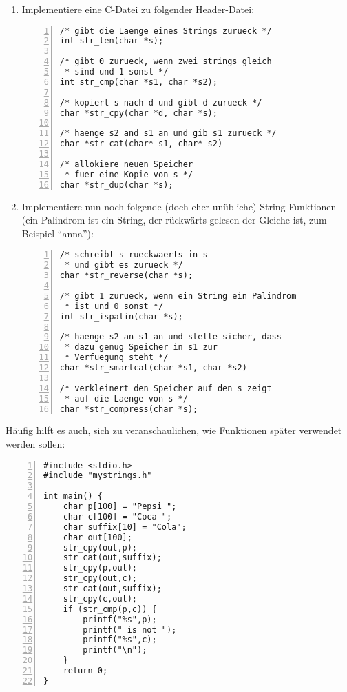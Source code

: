 \documentclass{uebungszettel}
\begin{document}
\begin{aufg}
\begin{enumerate}
\item Implementiere eine C-Datei zu folgender Header-Datei:
\begin{codelisting}
\begin{lstlisting}[numbers=left,numberstyle=\tiny,frame=tlrb]
/* gibt die Laenge eines Strings zurueck */
int str_len(char *s); 

/* gibt 0 zurueck, wenn zwei strings gleich 
 * sind und 1 sonst */
int str_cmp(char *s1, char *s2);

/* kopiert s nach d und gibt d zurueck */
char *str_cpy(char *d, char *s);

/* haenge s2 and s1 an und gib s1 zurueck */ 
char *str_cat(char* s1, char* s2)

/* allokiere neuen Speicher
 * fuer eine Kopie von s */
char *str_dup(char *s);
\end{lstlisting}
\end{codelisting}
\item \vspace{-1em} Implementiere nun noch folgende (doch eher unübliche) String-Funktionen (ein Palindrom ist ein String, der rückwärts gelesen der Gleiche ist, zum
Beispiel ``anna''):
\begin{codelisting}
\begin{lstlisting}[numbers=left,numberstyle=\tiny,frame=tlrb]
/* schreibt s rueckwaerts in s
 * und gibt es zurueck */
char *str_reverse(char *s);

/* gibt 1 zurueck, wenn ein String ein Palindrom
 * ist und 0 sonst */
int str_ispalin(char *s);

/* haenge s2 an s1 an und stelle sicher, dass
 * dazu genug Speicher in s1 zur
 * Verfuegung steht */
char *str_smartcat(char *s1, char *s2)

/* verkleinert den Speicher auf den s zeigt
 * auf die Laenge von s */
char *str_compress(char *s);
\end{lstlisting}
\end{codelisting}
\end{enumerate}
Häufig hilft es auch, sich zu veranschaulichen, wie Funktionen später verwendet werden sollen:
\begin{codelisting}
\begin{lstlisting}[numbers=left,numberstyle=\tiny,frame=tlrb]
#include <stdio.h>
#include "mystrings.h"

int main() {
	char p[100] = "Pepsi ";
	char c[100] = "Coca ";
	char suffix[10] = "Cola";
	char out[100];
	str_cpy(out,p); 
	str_cat(out,suffix); 
	str_cpy(p,out);
	str_cpy(out,c);
	str_cat(out,suffix);
	str_cpy(c,out);
	if (str_cmp(p,c)) {
		printf("%s",p);
		printf(" is not ");
		printf("%s",c);
		printf("\n");
	}
	return 0;
}
\end{lstlisting}
\end{codelisting}
\end{aufg}
\end{document}
